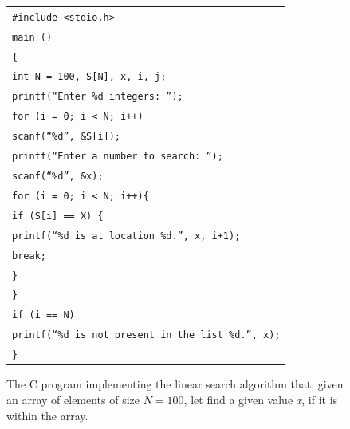 \begin{figure}[!b]
\begin{tabular}{l}
\texttt{\#include <stdio.h>}\\
\texttt{main ()}\\
\texttt{\{}\\
\texttt{int N = 100, S[N], x, i, j;}\\
\texttt{printf(``Enter \%d integers: '');}\\
\texttt{for (i = 0; i < N; i++)}\\
\qquad\texttt{scanf(``\%d'', \&S[i]);}\\
\texttt{printf(``Enter a number to search: '');}\\
\texttt{scanf(``\%d'', \&x);}\\
\texttt{for (i = 0; i < N; i++)\{}\\
\quad\texttt{if (S[i] == X) \{}\\
\qquad\texttt{printf(``\%d is at location \%d.'', x, i+1);}\\
\qquad\texttt{break;}\\
\quad\texttt{\}}\\
\texttt{\}}\\
\texttt{if (i == N)}\\
\quad\texttt{printf(``\%d is not present in the list \%d.'', x);}\\
\texttt{\}}
\end{tabular}
\caption{\label{fig:2.4}The C program implementing the linear search algorithm that, given an array of elements of size $N=100$, let find a given value \textit{x}, if it is within the array.}
\end{figure}


